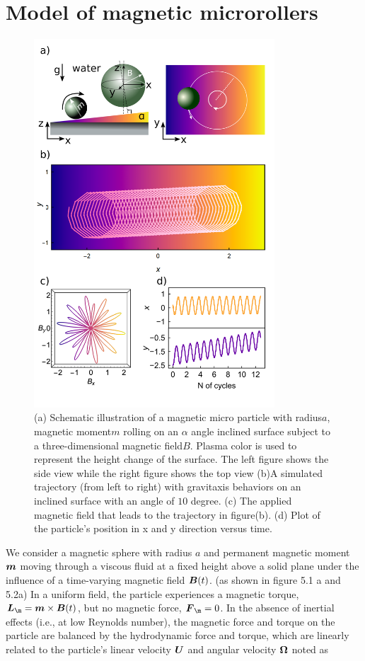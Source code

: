 \section{Model of  magnetic microrollers}
\begin{figure}[p]
\centering
\includegraphics[width=9cm]{figures/5_1.png}
\caption{ (a) Schematic illustration of a magnetic micro particle with radius$a$, magnetic moment$m$ rolling on an $\alpha$ angle inclined surface subject to a three-dimensional magnetic field$B$. Plasma color is used to represent the height change of the surface. The left figure shows the side view while the right figure shows the top view (b)A simulated trajectory (from left to right) with gravitaxis behaviors on an inclined surface with an angle of $10$ degree. (c) The applied magnetic field that leads to the trajectory in figure(b). (d) Plot of the particle's position in x and y direction versus time.}
\label{fig:5.1}
\end{figure}
We consider a magnetic sphere with radius $a$ and permanent magnetic moment $\boldsymbol{m}$ moving through a viscous fluid at a fixed height above a solid plane under the influence of a time-varying magnetic field $\boldsymbol{B}(t)$. (as shown in figure 5.1 a and 5.2a) In a uniform field, the particle experiences a magnetic torque, $\ve{L}_{\m}=\ve{m}\times\ve{B}(t)$, but no magnetic force, $\ve{F}_{\m}=0$. In the absence of inertial effects (i.e., at low Reynolds number), the magnetic force and torque on the particle are balanced by the hydrodynamic force and torque, which are linearly related to the particle's linear velocity $\boldsymbol{U}$ and angular velocity $\boldsymbol{\Omega}$ noted as
